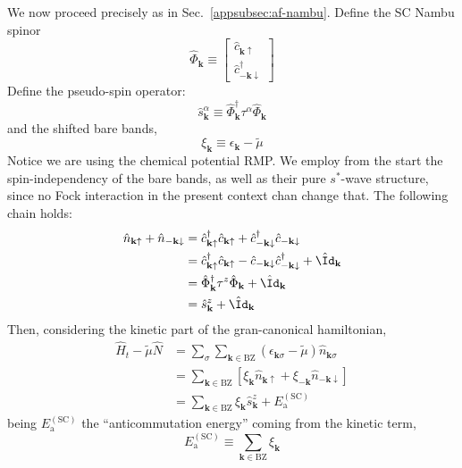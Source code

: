 {We now proceed precisely as in Sec.~\ref{appsubsec:af-nambu}. Define the SC Nambu spinor
\[
	\hat \Phi_\mathbf{k} \equiv \begin{bmatrix}
		\hat c_{\mathbf{k}\uparrow} \\
		\hat c_{-\mathbf{k}\downarrow}^\dagger
	\end{bmatrix}
\] 
Define the pseudo-spin operator:
\[
	\hat s_\mathbf{k}^\alpha \equiv \hat \Phi_\mathbf{k}^\dagger \tau^\alpha \hat \Phi_\mathbf{k}
\]
and the shifted bare bands,
\[
	\xi_\mathbf{k} \equiv \epsilon_\mathbf{k} - \tilde{\mu}
\]
Notice we are using the chemical potential RMP. We employ from the start the spin-independency of the bare bands, as well as their pure $s^*$-wave structure, since no Fock interaction in the present context chan change that. The following chain holds:
\begin{align}
	\hat n_{\mathbf{k}\uparrow} + \hat n_{-\mathbf{k}\downarrow} &= \hat c_{\mathbf{k}\uparrow}^\dagger \hat c_{\mathbf{k}\uparrow} + \hat c_{-\mathbf{k}\downarrow}^\dagger \hat c_{-\mathbf{k}\downarrow} \nonumber \\
	&= \hat c_{\mathbf{k}\uparrow}^\dagger \hat c_{\mathbf{k}\uparrow} - \hat c_{-\mathbf{k}\downarrow} \hat c_{-\mathbf{k}\downarrow}^\dagger + \hat \Id_\mathbf{k} \nonumber \\
	&=  \hat \Phi_\mathbf{k}^\dagger \tau^z \hat \Phi_\mathbf{k} + \hat \Id_\mathbf{k} \nonumber \\
	&=  \hat s_\mathbf{k}^z + \hat \Id_\mathbf{k} \label{appeq:sc-hm-n-z}
\end{align}
Then, considering the kinetic part of the gran-canonical hamiltonian,
\[
\begin{aligned}
	\hat H_t - \tilde{\mu}\hat N &= \sum_\sigma \sum_{\mathbf{k} \in \mathrm{BZ}} \left(
		\epsilon_{\mathbf{k}\sigma} - \tilde{\mu}
	\right) \hat n_{\mathbf{k}\sigma} \\
	&= \sum_{\mathbf{k} \in \mathrm{BZ}} \left[ 
		\xi_\mathbf{k} \hat n_{\mathbf{k}\uparrow} + \xi_{-\mathbf{k}} \hat n_{-\mathbf{k}\downarrow} 
	\right] \\
	&= \sum_{\mathbf{k} \in \mathrm{BZ}} \xi_\mathbf{k} \hat s_\mathbf{k}^z + E_\mathrm{a}^{(\mathrm{SC})}
\end{aligned}
\]
being $E_\mathrm{a}^{(\mathrm{SC})}$ the ``anticommutation energy'' coming from the kinetic term,
\begin{equation}\label{appeq:sc-hm-anticommutation-energy}
	E_\mathrm{a}^{(\mathrm{SC})} \equiv \sum_{\mathbf{k}\in\mathrm{BZ}} \xi_\mathbf{k}
\end{equation}}
